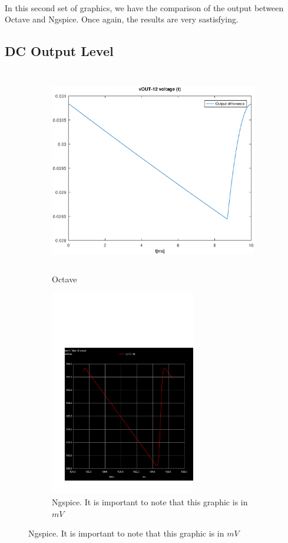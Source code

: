 \paragraph{}
In this second set of graphics, we have the comparison of the output between Octave and Ngspice. Once again, the results are very sastisfying.

\subsection{DC Output Level}
\label{subsec:third_topic_error}


\begin{figure}[H]

\begin{subfigure}{0.5\textwidth}
\includegraphics[width=1.1\linewidth, height=9cm]{outputdiff.eps} 
\caption{Octave}
\label{fig:theothirdcompare}
\end{subfigure}
\begin{subfigure}{0.5\textwidth}
\includegraphics[trim= 0cm 0cm 0cm 10cm, clip, width=1.1\linewidth, height=9cm]{trans3aux.pdf}
\caption{Ngspice. It is important to note that this graphic is in $mV$}
\label{fig:simthirdcompare}
\end{subfigure}

\label{fig:compar3}
\end{figure}

